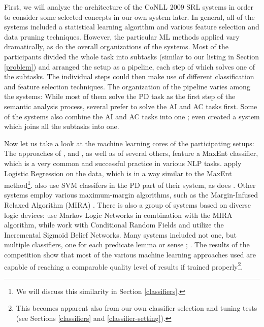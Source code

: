 \documentclass[12pt,notitlepage]{report}
\begin{document}
First, we will analyze the architecture of the CoNLL 2009 SRL systems in order to consider some selected concepts in our own system later. In general, all of the systems included a statistical learning algorithm and various feature selection and data pruning techniques. However, the particular ML methods applied vary dramatically, as do the overall organizations of the systems. Most of the participants divided the whole task into subtasks (similar to our listing in Section \ref{problem}) and arranged the setup as a pipeline, each step of which solves one of the subtasks. The individual steps could then make use of different classification and feature selection techniques. The organization of the pipeline varies among the systems: While most of them solve the PD task as the first step of the semantic analysis process, several \citep{bohnet09,zhao09} prefer to solve the AI and AC tasks first. Some of the systems also combine the AI and AC tasks into one \citep{che09,nugues09}; \citet{meza-ruiz09} even created a system which joins all the subtasks into one. 

Now let us take a look at the machine learning cores of the participating setups: The approaches of \citet{zhao09}, \citet{che09} and \citet{chen09}, as well as of several others, feature a MaxEnt classifier, which is a very common and successful practice in various NLP tasks. \citet{nugues09} apply Logistic Regression on the data, which is in a way similar to the MaxEnt method\footnote{We will discuss this similarity in Section \ref{classifiers}.}. \citet{che09} also use SVM classifers in the PD part of their system, as does \citet{tackstrom09}. Other systems \citep{bohnet09,asahara09} employ various maximum-margin algorithms, such as the Margin-Infused Relaxed Algorithm (MIRA) \citep{crammer03}. There is also a group of systems based on diverse logic devices: \citet{meza-ruiz09} use Markov Logic Networks in combination with the MIRA algorithm, while \citet{moreau09} work with Conditional Random Fields and \citet{merlo09} utilize the Incremental Sigmoid Belief Networks. Many systems included not one, but multiple classifiers, one for each predicate lemma or sense \citep{che09}; \citep{nugues09}. The results of the competition show that most of the various machine learning approaches used are capable of reaching a comparable quality level of results if trained properly\footnote{This becomes apparent also from our own classifier selection and tuning tests (see Sections \ref{classifiers} and \ref{classifier-setting}).}.
\end{document}
